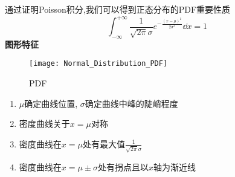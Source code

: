 通过证明Poisson积分,我们可以得到正态分布的PDF重要性质
\begin{equation}
    \int_{-\infty}^{+\infty}\frac{1}{\sqrt{2\pi}\sigma}e^{-\frac{(x-\mu)^2}{2\sigma^2}}\dd{x} = 1
\end{equation}
\textbf{图形特征}
\begin{figure}[h]
    \centering
    \texttt{[image: Normal\_Distribution\_PDF]}
    \caption{PDF}
\end{figure}
\begin{enumerate}
    \item $\mu$确定曲线位置, $\sigma$确定曲线中峰的陡峭程度
    \item 密度曲线关于$x=\mu$对称
    \item 密度曲线在$x=\mu$处有最大值$\frac{1}{\sqrt{2\pi}\sigma}$
    \item 密度曲线在$x=\mu\pm\sigma$处有拐点且以$x$轴为渐近线
\end{enumerate}

